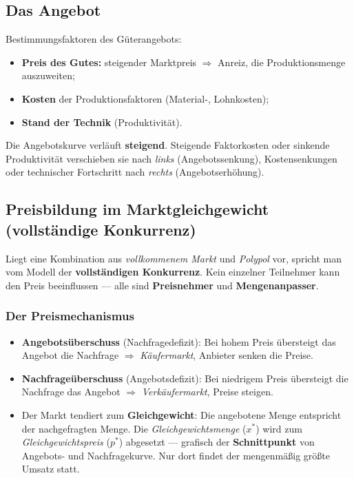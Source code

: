 \documentclass[11pt, a4paper]{article}
\begin{document}
\subsection{Das Angebot}

Bestimmungsfaktoren des Güterangebots:

\begin{itemize}
  \item \textbf{Preis des Gutes:} steigender Marktpreis $\Rightarrow$ Anreiz, die
    Produktionsmenge auszuweiten;
  \item \textbf{Kosten} der Produktionsfaktoren (Material-, Lohnkosten);
  \item \textbf{Stand der Technik} (Produktivität).
\end{itemize}

Die Angebotskurve verläuft \textbf{steigend}. Steigende Faktorkosten oder sinkende
Produktivität verschieben sie nach \emph{links} (Angebotssenkung), Kostensenkungen oder
technischer Fortschritt nach \emph{rechts} (Angebotserhöhung).

\subsection{Preisbildung im Marktgleichgewicht (vollständige Konkurrenz)}

Liegt eine Kombination aus \emph{vollkommenem Markt} und \emph{Polypol} vor, spricht man
vom Modell der \textbf{vollständigen Konkurrenz}. Kein einzelner Teilnehmer kann den Preis
beeinflussen --- alle sind \textbf{Preisnehmer} und \textbf{Mengenanpasser}.

\subsubsection{Der Preismechanismus}

\begin{itemize}
  \item \textbf{Angebotsüberschuss} (Nachfragedefizit): Bei hohem Preis übersteigt das
    Angebot die Nachfrage $\Rightarrow$ \emph{Käufermarkt}, Anbieter senken die Preise.
  \item \textbf{Nachfrageüberschuss} (Angebotsdefizit): Bei niedrigem Preis übersteigt die
    Nachfrage das Angebot $\Rightarrow$ \emph{Verkäufermarkt}, Preise steigen.
  \item Der Markt tendiert zum \textbf{Gleichgewicht}: Die angebotene Menge entspricht der
    nachgefragten Menge. Die \emph{Gleichgewichtsmenge} ($x^*$) wird zum
    \emph{Gleichgewichtspreis} ($p^*$) abgesetzt --- grafisch der \textbf{Schnittpunkt} von
    Angebots- und Nachfragekurve. Nur dort findet der mengenmäßig größte Umsatz statt.
\end{itemize}
\end{document}
